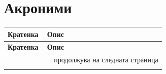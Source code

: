 \newpage
\thispagestyle{blank}
\section*{Акроними}
\label{sec:acronyms}

\begingroup
\setlength{\parskip}{0pt}%
\renewcommand{\arraystretch}{1.15}%
\setlength{\tabcolsep}{6pt}%

\begin{longtable}{p{0.24\linewidth} >{\raggedright\arraybackslash}p{0.72\linewidth}}
\toprule
\textbf{Кратенка} & \textbf{Опис} \\
\midrule
\endfirsthead
\toprule
\textbf{Кратенка} & \textbf{Опис} \\
\midrule
\endhead
\midrule
\multicolumn{2}{r}{\small продолжува на следната страница} \\
\midrule
\endfoot
\bottomrule
\endlastfoot


\end{longtable}
